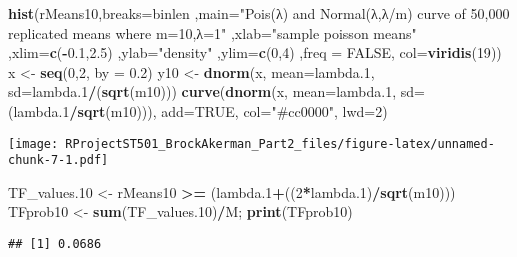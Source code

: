 \documentclass[
]{article}
\newenvironment{Shaded}{\begin{snugshade}}{\end{snugshade}}
\newcommand{\DataTypeTok}[1]{\textcolor[rgb]{0.13,0.29,0.53}{#1}}
\newcommand{\DecValTok}[1]{\textcolor[rgb]{0.00,0.00,0.81}{#1}}
\newcommand{\FloatTok}[1]{\textcolor[rgb]{0.00,0.00,0.81}{#1}}
\newcommand{\KeywordTok}[1]{\textcolor[rgb]{0.13,0.29,0.53}{\textbf{#1}}}
\newcommand{\NormalTok}[1]{#1}
\newcommand{\OperatorTok}[1]{\textcolor[rgb]{0.81,0.36,0.00}{\textbf{#1}}}
\newcommand{\OtherTok}[1]{\textcolor[rgb]{0.56,0.35,0.01}{#1}}
\newcommand{\StringTok}[1]{\textcolor[rgb]{0.31,0.60,0.02}{#1}}
\begin{document}
\begin{Shaded}
\begin{Highlighting}[]
\KeywordTok{hist}\NormalTok{(rMeans10,}\DataTypeTok{breaks=}\NormalTok{binlen ,}\DataTypeTok{main=}\StringTok{"Pois(λ) and Normal(λ,λ/m) curve of 50,000 replicated means where m=10,λ=1"}\NormalTok{ ,}\DataTypeTok{xlab=}\StringTok{"sample poisson means"}\NormalTok{ ,}\DataTypeTok{xlim=}\KeywordTok{c}\NormalTok{(}\OperatorTok{-}\FloatTok{0.1}\NormalTok{,}\FloatTok{2.5}\NormalTok{) ,}\DataTypeTok{ylab=}\StringTok{"density"}\NormalTok{ ,}\DataTypeTok{ylim=}\KeywordTok{c}\NormalTok{(}\DecValTok{0}\NormalTok{,}\DecValTok{4}\NormalTok{) ,}\DataTypeTok{freq =} \OtherTok{FALSE}\NormalTok{, }\DataTypeTok{col=}\KeywordTok{viridis}\NormalTok{(}\DecValTok{19}\NormalTok{))}
\NormalTok{x <-}\StringTok{ }\KeywordTok{seq}\NormalTok{(}\DecValTok{0}\NormalTok{,}\DecValTok{2}\NormalTok{, }\DataTypeTok{by =} \FloatTok{0.2}\NormalTok{)}
\NormalTok{y10 <-}\StringTok{ }\KeywordTok{dnorm}\NormalTok{(x, }\DataTypeTok{mean=}\NormalTok{lambda}\FloatTok{.1}\NormalTok{, }\DataTypeTok{sd=}\NormalTok{lambda}\FloatTok{.1}\OperatorTok{/}\NormalTok{(}\KeywordTok{sqrt}\NormalTok{(m10)))}
\KeywordTok{curve}\NormalTok{(}\KeywordTok{dnorm}\NormalTok{(x, }\DataTypeTok{mean=}\NormalTok{lambda}\FloatTok{.1}\NormalTok{, }\DataTypeTok{sd=}\NormalTok{(lambda}\FloatTok{.1}\OperatorTok{/}\KeywordTok{sqrt}\NormalTok{(m10))), }\DataTypeTok{add=}\OtherTok{TRUE}\NormalTok{, }\DataTypeTok{col=}\StringTok{"#cc0000"}\NormalTok{, }\DataTypeTok{lwd=}\DecValTok{2}\NormalTok{)}
\end{Highlighting}
\end{Shaded}

\texttt{[image: RProjectST501\_BrockAkerman\_Part2\_files/figure-latex/unnamed-chunk-7-1.pdf]}

\begin{Shaded}
\begin{Highlighting}[]
\NormalTok{TF_values}\FloatTok{.10}\NormalTok{ <-}\StringTok{ }\NormalTok{rMeans10 }\OperatorTok{>=}\StringTok{ }\NormalTok{(lambda}\FloatTok{.1}\OperatorTok{+}\NormalTok{((}\DecValTok{2}\OperatorTok{*}\NormalTok{lambda}\FloatTok{.1}\NormalTok{)}\OperatorTok{/}\KeywordTok{sqrt}\NormalTok{(m10)))}
\NormalTok{TFprob10 <-}\StringTok{ }\KeywordTok{sum}\NormalTok{(TF_values}\FloatTok{.10}\NormalTok{)}\OperatorTok{/}\NormalTok{M; }\KeywordTok{print}\NormalTok{(TFprob10)}
\end{Highlighting}
\end{Shaded}

\begin{verbatim}
## [1] 0.0686
\end{verbatim}
\end{document}
